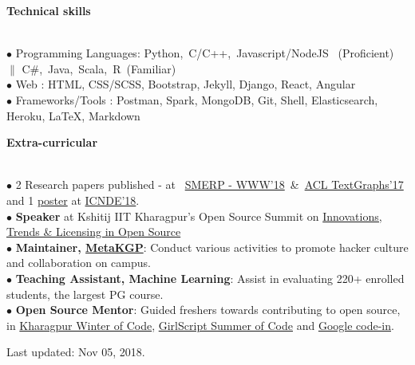\documentclass[11pt, a4paper]{resume}
\newcommand{\important}[1]{
  \textcolor{mypurple}{#1}
}
\newcommand{\fillit}[1]{
  \leavevmode\xleaders\hbox{#1}\hfill\kern0pt
}
\newcommand{\sectionTitle}[1]{
  \begin{Large}
      \important{\textbf{#1}} 
    \end{Large}
    \important{\rlap{\rule[.5ex]{\linegoal}{0.5pt}}{}}
     \vspace{0.1em}\\
}
\begin{document}
\sectionTitle{Technical skills}
$\bullet$ Programming Languages: Python,\, C/C++,\, Javascript/NodeJS \, (Proficient)\, $\|$ C\#,\, Java,\, Scala,\, R\, (Familiar) \\
$\bullet$ Web : HTML, CSS/SCSS, Bootstrap, Jekyll, Django, React, Angular \\
$\bullet$  Frameworks/Tools
: Postman, Spark, MongoDB, Git, Shell, Elasticsearch, Heroku, LaTeX, Markdown

\sectionTitle{Extra-curricular}
$\bullet$ 2 Research papers published - at \, \href{https://www.cse.iitk.ac.in/users/kripa/smerp2018/}{SMERP - WWW'18} \,\&\, \href{https://sites.google.com/site/textgraphs2017/program}{ACL TextGraphs'17} and 1 \href{https://drive.google.com/file/d/1fCH2AAAHWp5JLwQxLNGoOYoGnyWrolHf/view?usp=sharing}{poster} at \href{http://cse.iitkgp.ac.in/conf/NSDE/sds/ICNDE2018/pages/selected.html}{ICNDE'18}. \\
$\bullet$ {\bf Speaker} at Kshitij IIT Kharagpur's Open Source Summit on \href{https://www.youtube.com/watch?v=lk4ciY3NSbA}{Innovations, Trends \& Licensing in Open Source}\\
$\bullet$ {\bf Maintainer, \href{http://metakgp.github.io}{MetaKGP}}: Conduct various activities to promote hacker culture and collaboration on campus.\\
$\bullet$ {\bf Teaching Assistant, Machine Learning}: Assist in evaluating 220+ enrolled students, the largest PG course.\\
$\bullet$ {\bf Open Source Mentor}: Guided freshers towards contributing to open source, in \href{https://kwoc.kossiitkgp.in/}{Kharagpur Winter of Code},  \href{https://gssoc.tech/projects.html#facebook-archive}{GirlScript Summer of Code} and 
\href{https://drive.google.com/open?id=1b1xN6dxnPMP9vKaUW6zxeE__70iP1AgJ}{Google code-in}.
  \vspace*{\fill}
    \vspace{-0.63em}
  \begin{flushright}
  \tiny \textcolor{othergray}{Last updated: Nov 05, 2018.}
  \end{flushright}
    
\end{document}
